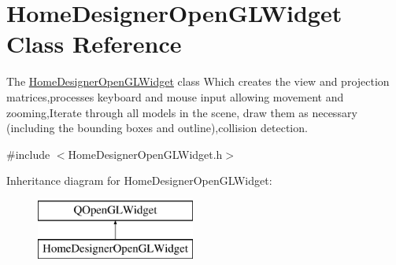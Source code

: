 \hypertarget{class_home_designer_open_g_l_widget}{}\section{Home\+Designer\+Open\+G\+L\+Widget Class Reference}
\label{class_home_designer_open_g_l_widget}


The \hyperlink{class_home_designer_open_g_l_widget}{Home\+Designer\+Open\+G\+L\+Widget} class Which creates the view and projection matrices,processes keyboard and mouse input allowing movement and zooming,Iterate through all models in the scene, draw them as necessary (including the bounding boxes and outline),collision detection.  




{\ttfamily \#include $<$Home\+Designer\+Open\+G\+L\+Widget.\+h$>$}

Inheritance diagram for Home\+Designer\+Open\+G\+L\+Widget\+:\begin{figure}[H]
\begin{center}
\leavevmode
\includegraphics[height=2.000000cm]{class_home_designer_open_g_l_widget}
\end{center}
\end{figure}
